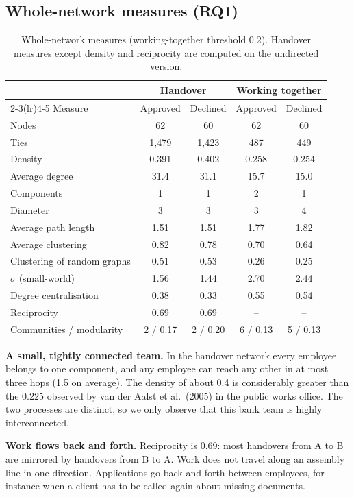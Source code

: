 \documentclass[12pt, a4paper]{article}
\begin{document}
\subsection{Whole-network measures (RQ1)}

\begin{table}[h]
\centering
\small
\caption{Whole-network measures (working-together threshold 0.2). Handover measures except density and reciprocity are computed on the undirected version.}
\label{tab:whole}
\begin{tabular}{lcccc}
\toprule
 & \multicolumn{2}{c}{Handover} & \multicolumn{2}{c}{Working together} \\
\cmidrule(lr){2-3}\cmidrule(lr){4-5}
Measure & Approved & Declined & Approved & Declined \\
\midrule
Nodes & 62 & 60 & 62 & 60 \\
Ties & 1,479 & 1,423 & 487 & 449 \\
Density & 0.391 & 0.402 & 0.258 & 0.254 \\
Average degree & 31.4 & 31.1 & 15.7 & 15.0 \\
Components & 1 & 1 & 2 & 1 \\
Diameter & 3 & 3 & 3 & 4 \\
Average path length & 1.51 & 1.51 & 1.77 & 1.82 \\
Average clustering & 0.82 & 0.78 & 0.70 & 0.64 \\
Clustering of random graphs & 0.51 & 0.53 & 0.26 & 0.25 \\
$\sigma$ (small-world) & 1.56 & 1.44 & 2.70 & 2.44 \\
Degree centralisation & 0.38 & 0.33 & 0.55 & 0.54 \\
Reciprocity & 0.69 & 0.69 & -- & -- \\
Communities / modularity & 2 / 0.17 & 2 / 0.20 & 6 / 0.13 & 5 / 0.13 \\
\bottomrule
\end{tabular}
\end{table}

\textbf{A small, tightly connected team.} In the handover network every employee belongs to one component, and any employee can reach any other in at most three hops (1.5 on average). The density of about 0.4 is considerably greater than the 0.225 observed by van der Aalst et al.\ (2005) in the public works office. The two processes are distinct, so we only observe that this bank team is highly interconnected.

\textbf{Work flows back and forth.} Reciprocity is 0.69: most handovers from A to B are mirrored by handovers from B to A. Work does not travel along an assembly line in one direction. Applications go back and forth between employees, for instance when a client has to be called again about missing documents.
\end{document}

